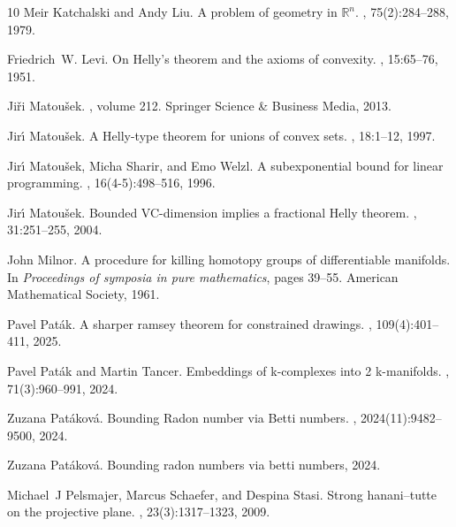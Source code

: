 \documentclass[a4paper,UKenglish,thm-restate]{article}
\begin{document}
\begin{thebibliography}{10}
Meir Katchalski and Andy Liu.
\newblock A problem of geometry in {$\mathbb{R}^n$}.
,
  75(2):284--288, 1979.

Friedrich~W. Levi.
\newblock On {H}elly's theorem and the axioms of convexity.
, 15:65--76, 1951.

Ji{\v r}i Matou{\v s}ek.
, volume 212.
\newblock Springer Science \& Business Media, 2013.

Jir{\'\i} Matou\v{s}ek.
\newblock A {H}elly-type theorem for unions of convex sets.
, 18:1--12, 1997.

Jir{\'\i} Matou\v{s}ek, Micha Sharir, and Emo Welzl.
\newblock A subexponential bound for linear programming.
, 16(4-5):498--516, 1996.

Jir{\'\i} Matou{š}ek.
\newblock Bounded {VC}-dimension implies a fractional {H}elly theorem.
, 31:251--255, 2004.

John Milnor.
\newblock A procedure for killing homotopy groups of differentiable manifolds.
\newblock In {\em Proceedings of symposia in pure mathematics}, pages 39--55.
  American Mathematical Society, 1961.

Pavel Pat{\'a}k.
\newblock A sharper ramsey theorem for constrained drawings.
, 109(4):401--411, 2025.

Pavel Pat{\'a}k and Martin Tancer.
\newblock Embeddings of k-complexes into 2 k-manifolds.
, 71(3):960--991, 2024.

Zuzana Patáková.
\newblock Bounding {R}adon number via {B}etti numbers.
,
  2024(11):9482--9500, 2024.

Zuzana Patáková.
\newblock Bounding radon numbers via betti numbers, 2024.

Michael~J Pelsmajer, Marcus Schaefer, and Despina Stasi.
\newblock Strong hanani--tutte on the projective plane.
, 23(3):1317--1323, 2009.


\end{thebibliography}
\end{document}
